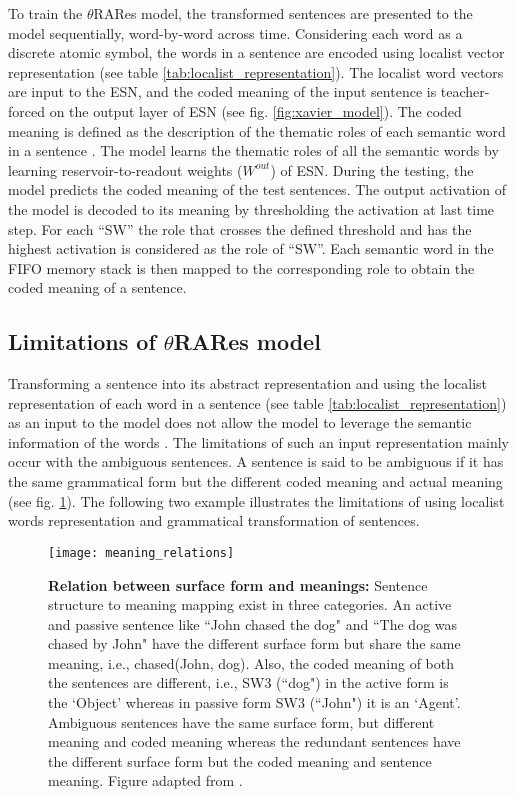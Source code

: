 To train the $\theta$RARes model, the transformed sentences are presented to the model sequentially, word-by-word across time. Considering each word as a discrete atomic symbol, the words in a sentence are encoded using localist vector representation (see table \ref{tab:localist_representation}). The localist word vectors are input to the ESN, and the coded meaning of the input sentence is teacher-forced on the output layer of ESN (see fig. \ref{fig:xavier_model}). The coded meaning is defined as the description of the thematic roles of each semantic word in a sentence \cite{xavier:2013:RT}. The model learns the thematic roles of all the semantic words by learning reservoir-to-readout weights ($W^{out}$) of ESN. During the testing, the model predicts the coded meaning of the test sentences. The output activation of the model is decoded to its meaning by thresholding the activation at last time step. For each ``SW'' the role that crosses the defined threshold and has the highest activation is considered as the role of ``SW''. Each semantic word in the FIFO memory stack is then mapped to the corresponding role to obtain the coded meaning of a sentence.

\subsection{Limitations of $\theta$RARes model }

Transforming a sentence into its abstract representation and using the localist representation of each word in a sentence (see table \ref{tab:localist_representation}) as an input to the model does not allow the model to leverage the semantic information of the words \cite{w2v:tensor_flow}. The limitations of such an input representation mainly occur with the ambiguous sentences. A sentence is said to be ambiguous if it has the same grammatical form but the different coded meaning and actual meaning (see fig. \ref{fig:meaning_realtions}). The following two example illustrates the limitations of using localist words representation and grammatical transformation of sentences.

\begin{figure}[hbtp]
\centering
\texttt{[image: meaning\_relations]}
\caption[Relation between sentence surface form and meanings.] {\textbf{Relation between surface form and meanings: } {\small Sentence structure to meaning mapping exist in three categories. An active and passive sentence like ``John chased the dog" and ``The dog was chased by John" have the different surface form but share the same meaning, i.e., chased(John, dog). Also, the coded meaning of both the sentences are different, i.e., SW3 (``dog") in the active form is the `Object' whereas in passive form SW3 (``John") it is an `Agent'. Ambiguous sentences have the same surface form, but different meaning and coded meaning whereas the redundant sentences have the different surface form but the coded meaning and sentence meaning. Figure adapted from \cite{xavier:2013:RT}.}}
\label{fig:meaning_realtions}
\end{figure}

